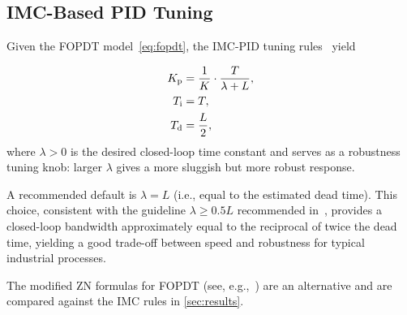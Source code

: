 \subsection{IMC-Based PID Tuning}
\label{sec:theory:imc}

Given the FOPDT model~\eqref{eq:fopdt}, the IMC-PID tuning
rules~\cite{Rivera1986} yield

\begin{align}
    K_{\mathrm{p}} &= \frac{1}{K} \cdot \frac{T}{\lambda + L}, \label{eq:Kp} \\
    T_{\mathrm{i}}  &= T,                                         \label{eq:Ti} \\
    T_{\mathrm{d}}  &= \frac{L}{2},                               \label{eq:Td}
\end{align}
where $\lambda > 0$ is the desired closed-loop time constant and serves as a
robustness tuning knob: larger $\lambda$ gives a more sluggish but more
robust response.

A recommended default is $\lambda = L$ (i.e., equal to the estimated dead
time). This choice, consistent with the guideline $\lambda \geq 0.5L$
recommended in~\cite{Rivera1986}, provides a closed-loop bandwidth
approximately equal to the reciprocal of twice the dead time, yielding a
good trade-off between speed and robustness for typical industrial processes.

\begin{remark}
    The modified ZN formulas for FOPDT (see, e.g.,~\cite{Aastrom2006}) are
    an alternative and are compared against the IMC rules in
    \cref{sec:results}.
\end{remark}
